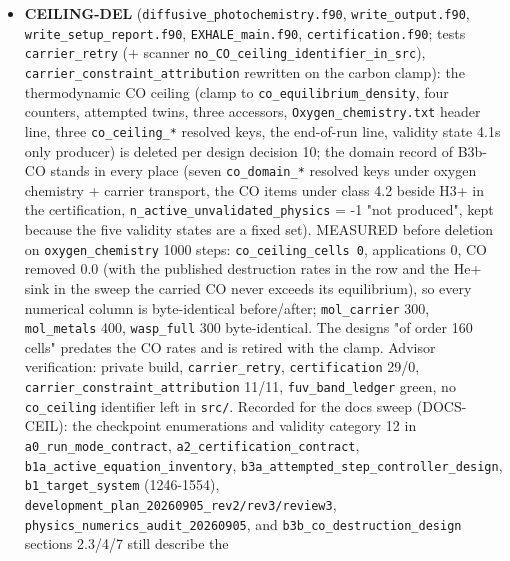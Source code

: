 \documentclass[english,a4paper]{my_memo}
\begin{document}
\begin{itemize}
  Outside scope recorded: ESWENO3 measures second order on a smooth profile
  (1.92 against PLM 1.97, face error 8x PLM), a property of the primitive
  reconstruction to look at (WENO3-ORDER); \texttt{hp\_*} cases need
  \texttt{output/Hydro\_ioniz\_IC.txt} in place; \texttt{element\_flux\_profile.txt} has a
  trailing text column.
\item
  \textbf{CEILING-DEL} (\texttt{diffusive\_photochemistry.f90}, \texttt{write\_output.f90},
  \texttt{write\_setup\_report.f90}, \texttt{EXHALE\_main.f90}, \texttt{certification.f90}; tests
  \texttt{carrier\_retry} (+ scanner \texttt{no\_CO\_ceiling\_identifier\_in\_src}),
  \texttt{carrier\_constraint\_attribution} rewritten on the carbon clamp): the
  thermodynamic CO ceiling (clamp to \texttt{co\_equilibrium\_density}, four
  counters, attempted twins, three accessors, \texttt{Oxygen\_chemistry.txt} header
  line, three \texttt{co\_ceiling\_*} resolved keys, the end-of-run line, validity
  state 4.1\textquotesingle s only producer) is deleted per design decision 10; the domain
  record of B3b-CO stands in every place (seven \texttt{co\_domain\_*} resolved keys
  under oxygen chemistry + carrier transport, the CO items under class 4.2
  beside H3+ in the certification, \texttt{n\_active\_unvalidated\_physics} = -1 "not
  produced", kept because the five validity states are a fixed set). MEASURED
  before deletion on \texttt{oxygen\_chemistry} 1000 steps: \texttt{co\_ceiling\_cells\ 0},
  applications 0, CO removed 0.0 (with the published destruction rates in
  the row and the He+ sink in the sweep the carried CO never exceeds its
  equilibrium), so every numerical column is byte-identical before/after;
  \texttt{mol\_carrier} 300, \texttt{mol\_metals} 400, \texttt{wasp\_full} 300 byte-identical. The
  design\textquotesingle s "of order 160 cells" predates the CO rates and is retired with the
  clamp. Advisor verification: private build, \texttt{carrier\_retry}, \texttt{certification}
  29/0, \texttt{carrier\_constraint\_attribution} 11/11, \texttt{fuv\_band\_ledger} green, no
  \texttt{co\_ceiling} identifier left in \texttt{src/}. Recorded for the docs sweep
  (DOCS-CEIL): the checkpoint enumerations and validity category 12 in
  \texttt{a0\_run\_mode\_contract}, \texttt{a2\_certification\_contract}, \texttt{b1a\_active\_equation\_inventory},
  \texttt{b3a\_attempted\_step\_controller\_design}, \texttt{b1\_target\_system} (1246-1554),
  \texttt{development\_plan\_20260905\_rev2/rev3/review3}, \texttt{physics\_numerics\_audit\_20260905},
  and \texttt{b3b\_co\_destruction\_design} sections 2.3/4/7 still describe the

\end{itemize}
\end{document}
